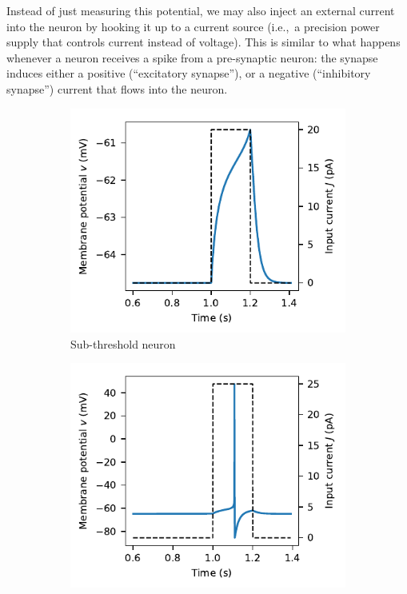 \documentclass[10pt,letterpaper,oneside]{article}
\begin{document}
Instead of just measuring this potential, we may also inject an external current into the neuron by hooking it up to a current source (i.e.,~a precision power supply that controls current instead of voltage). This is similar to what happens whenever a neuron receives a spike from a pre-synaptic neuron: the synapse induces either a positive (\enquote{excitatory synapse}), or a negative (\enquote{inhibitory synapse}) current that flows into the neuron.

\begin{figure}
	\centering%
	\begin{subfigure}{0.5\textwidth}%
		\centering
		\includegraphics{media/hh_neuron_sub_threshold.pdf}%
		\caption{Sub-threshold neuron}%
		\label{fig:hh_neuron_sub_threshold}
	\end{subfigure}%
	\begin{subfigure}{0.5\textwidth}%
		\centering
		\includegraphics{media/hh_neuron_super_threshold.pdf}%

\end{subfigure}
\end{figure}
\end{document}
